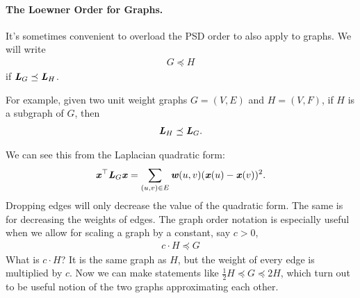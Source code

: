 \paragraph{The Loewner Order for Graphs.}

It's sometimes convenient to overload the PSD order to also
apply to graphs. We will write
\begin{align*}
G \preceq H
\end{align*}
if $\boldsymbol{\mathit{L}}_{G} \preceq
\boldsymbol{\mathit{L}}_H$.

For example, given two unit weight graphs
$G = (V,E)$ and $H = (V,F)$, if $H$ is a subgraph of $G$,
then
\begin{align*}
\boldsymbol{\mathit{L}}_H \preceq \boldsymbol{\mathit{L}}_G.
\end{align*}

We can see this from the Laplacian quadratic form:
\begin{align*}
\boldsymbol{\mathit{x}}^\top \boldsymbol{\mathit{L}}_G \boldsymbol{\mathit{x}} = \sum_{ (u,v) \in E } \boldsymbol{\mathit{w}}(u,v) ( \boldsymbol{\mathit{x}}(u) - \boldsymbol{\mathit{x}}(v) )^2.
\end{align*}
Dropping edges will only decrease the value of the quadratic form. The
same is for decreasing the weights of edges.
The graph order notation is especially useful when we allow for
scaling a graph by a constant, say $c > 0$,
\begin{align*}
c \cdot H \preceq G
\end{align*}
What is $c \cdot H$? It is the same graph as $H$, but the weight of
every edge is multiplied by $c$.
Now we can make statements like $\frac{1}{2} H \preceq G \preceq 2 H$,
which turn out to be useful notion of the two graphs approximating
each other.


